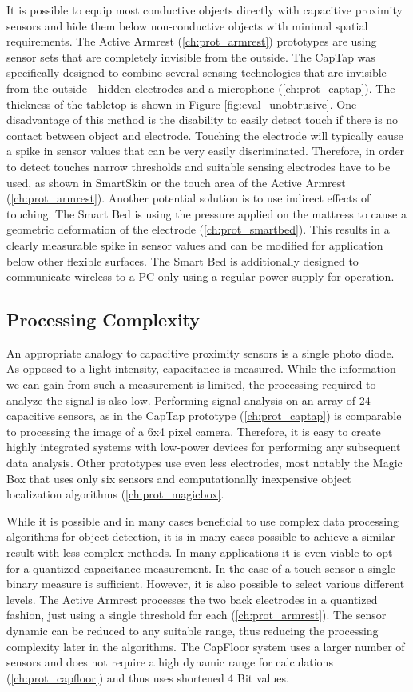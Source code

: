 It is possible to equip most conductive objects directly with capacitive proximity sensors and hide them below non-conductive objects with minimal spatial requirements. The Active Armrest (\ref{ch:prot_armrest}) prototypes are using sensor sets that are completely invisible from the outside.  The CapTap was specifically designed to combine several sensing technologies that are invisible from the outside - hidden electrodes and a microphone (\ref{ch:prot_captap}). The thickness of the tabletop is shown in Figure \ref{fig:eval_unobtrusive}. One disadvantage of this method is the disability to easily detect touch if there is no contact between object and electrode. Touching the electrode will typically cause a spike in sensor values that can be very easily discriminated. Therefore, in order to detect touches narrow thresholds and suitable sensing electrodes have to be used, as shown in SmartSkin \cite{rekimoto2002smartskin} or the touch area of the Active Armrest (\ref{ch:prot_armrest}). Another potential solution is to use indirect effects of touching. The Smart Bed is using the pressure applied on the mattress to cause a geometric deformation of the electrode (\ref{ch:prot_smartbed}). This results in a clearly measurable spike in sensor values and can be modified for application below other flexible surfaces.
The Smart Bed is additionally designed to communicate wireless to a PC only using a regular power supply for operation.
 
\subsection{Processing Complexity}
An appropriate analogy to capacitive proximity sensors is a single photo diode. As opposed to a light intensity, capacitance is measured. While the information we can gain from such a measurement is limited, the processing required to analyze the signal is also low. Performing signal analysis on an array of 24 capacitive sensors, as in the CapTap prototype (\ref{ch:prot_captap}) is comparable to processing the image of a 6x4 pixel camera. Therefore, it is easy to create highly integrated systems with low-power devices for performing any subsequent data analysis. Other prototypes use even less electrodes, most notably the Magic Box that uses only six sensors and computationally inexpensive object localization algorithms (\ref{ch:prot_magicbox}. 

While it is possible and in many cases beneficial to use complex data processing algorithms for object detection, it is in many cases possible to achieve a similar result with less complex methods. In many applications it is even viable to opt for a quantized capacitance measurement. In the case of a touch sensor a single binary measure is sufficient. However, it is also possible to select various different levels. The Active Armrest processes the two back electrodes in a quantized fashion, just using a single threshold for each (\ref{ch:prot_armrest}). The sensor dynamic can be reduced to any suitable range, thus reducing the processing complexity later in the algorithms. The CapFloor system uses a larger number of sensors and does not require a high dynamic range for calculations  (\ref{ch:prot_capfloor}) and thus uses shortened 4 Bit values.

